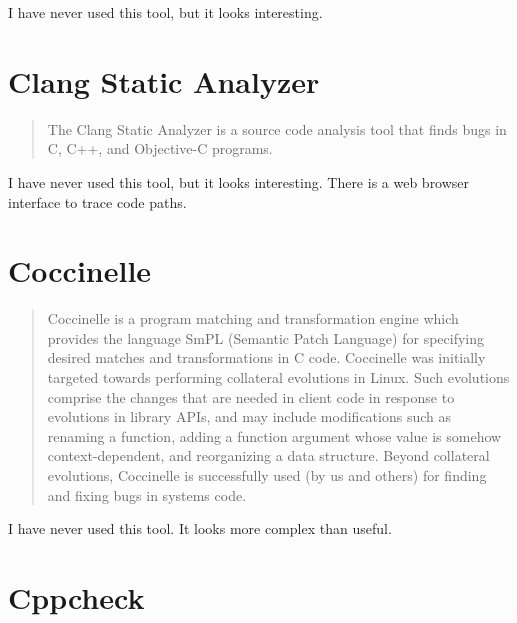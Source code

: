 \documentclass[12pt]{article}
\begin{document}
I have never used this tool, but it looks interesting.
\cite{checkedc}
\section{Clang Static Analyzer}
\begin{quote}
The Clang Static Analyzer is a source code analysis tool that finds bugs
in C, C++, and Objective-C programs.
\end{quote}

I have never used this tool, but it looks interesting. There is a web
browser interface to trace code paths.
\cite{clang}
\section{Coccinelle}

\begin{quote}
Coccinelle is a program matching and transformation engine which
provides the language SmPL (Semantic Patch Language) for specifying
desired matches and transformations in C code. Coccinelle was initially
targeted towards performing collateral evolutions in Linux. Such
evolutions comprise the changes that are needed in client code in
response to evolutions in library APIs, and may include modifications
such as renaming a function, adding a function argument whose value is
somehow context-dependent, and reorganizing a data structure. Beyond
collateral evolutions, Coccinelle is successfully used (by us and others)
for finding and fixing bugs in systems code.
\end{quote}

I have never used this tool. It looks more complex than useful.
\cite{coccinelle}
\section{Cppcheck}
\end{document}

